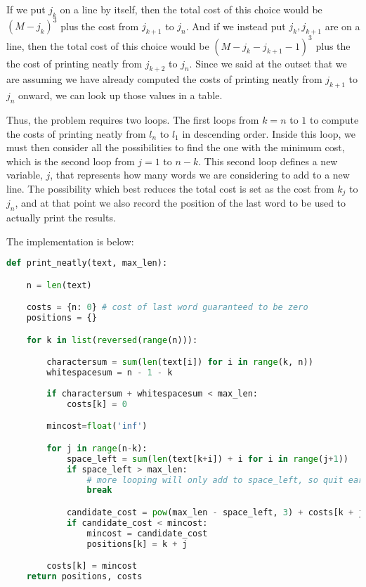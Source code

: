 \documentclass[]{book}
\theoremstyle{definition}
\begin{document}
    If we put $j_{k}$ on a line by itself, then the total cost of this choice
    would be $(M - j_{k})^3$ plus the cost from $j_{k+1}$ to $j_n$. And if we
    instead put $j_{k}, j_{k+1}$ are on a line, then the total cost
    of this choice would be $(M - j_{k} - j_{k+1} - 1)^3$ plus the
    the cost of printing neatly from $j_{k+2}$ to $j_n$. Since we said
    at the outset that we are assuming we have already computed the costs
    of printing neatly from $j_{k+1}$ to $j_n$ onward, we can look up
    those values in a table.

    Thus, the problem requires two loops. The first loops from $k=n$ to $1$
    to compute the costs of printing neatly from $l_n$ to $l_1$ 
    in descending order. Inside this loop, we must then consider
    all the possibilities to find the one with the minimum cost, which is
    the second loop from $j=1$ to $n - k$. This second loop defines a
    new variable, $j$, that represents how many words we are considering
    to add to a new line. The possibility which best reduces the total
    cost is set as the cost from $k_j$ to $j_n$, and at that point
    we also record the position of the last word to be used
    to actually print the results.

    The implementation is below:

\begin{lstlisting}[language=Python, caption=Print Neatly Algorithm, label=snip:printneatly]
def print_neatly(text, max_len):

    n = len(text)

    costs = {n: 0} # cost of last word guaranteed to be zero
    positions = {}

    for k in list(reversed(range(n))):

        charactersum = sum(len(text[i]) for i in range(k, n))
        whitespacesum = n - 1 - k
        
        if charactersum + whitespacesum < max_len:
            costs[k] = 0

        mincost=float('inf')

        for j in range(n-k):
            space_left = sum(len(text[k+i]) + i for i in range(j+1))
            if space_left > max_len:
                # more looping will only add to space_left, so quit early
                break 

            candidate_cost = pow(max_len - space_left, 3) + costs[k + j + 1]
            if candidate_cost < mincost:
                mincost = candidate_cost
                positions[k] = k + j

        costs[k] = mincost
    return positions, costs\end{lstlisting}
\end{document}
